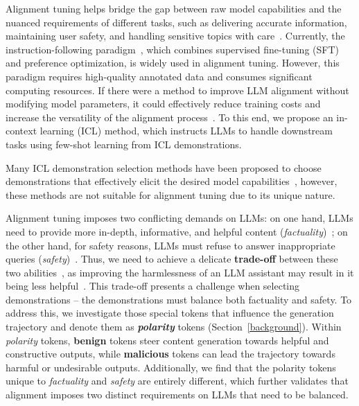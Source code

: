 %
Alignment tuning helps bridge the gap between raw model capabilities and the nuanced requirements of different tasks, such as delivering accurate information, maintaining user safety, and handling sensitive topics with care~\citep{shneiderman2020bridging,shen2023large,wang2023aligning,DBLP:conf/iclr/Qi0XC0M024}. 
%
Currently, the instruction-following paradigm~\citep{ouyang2022training,sun2023aligning,DBLP:conf/iclr/DaiPSJXL0024,rafailov2024direct,zhou2024lima,wu2024self}, which combines supervised fine-tuning (SFT) and preference optimization, is widely used in alignment tuning. 
However, this paradigm requires high-quality annotated data and consumes significant computing resources. 
If there were a method to improve LLM alignment without modifying model parameters, it could effectively reduce training costs and increase the versatility of the alignment process~\citep{brown2020language}. 
To this end, we propose an in-context learning (ICL) method, which instructs LLMs to handle downstream tasks using few-shot learning from ICL demonstrations.

Many ICL demonstration selection methods have been proposed to choose demonstrations that effectively elicit the desired model capabilities~\citep{liu2022makes,min2022rethinking,DBLP:conf/icml/Ye0F0K23,DBLP:journals/corr/abs-2305-14128,peng2024revisiting,DBLP:conf/icml/ChoiL24,DBLP:conf/eacl/WangYW24}, however, these methods are not suitable for alignment tuning due to its unique nature. 

Alignment tuning imposes two conflicting demands on LLMs: on one hand, LLMs need to provide more in-depth, informative, and helpful content (\emph{factuality})~\citep{shen2023large}; on the other hand, for safety reasons, LLMs must refuse to answer inappropriate queries (\emph{safety})~\citep{ji2024beavertails}. 
Thus, we need to achieve a delicate \textbf{trade-off} between these two abilities~\citep{DBLP:journals/corr/abs-2404-09932}, as improving the harmlessness of an LLM assistant may result in it being less helpful~\citep{DBLP:journals/corr/abs-2204-05862}.
This trade-off presents a challenge when selecting demonstrations -- the demonstrations must balance both factuality and safety. 
To address this, we investigate those special tokens that influence the generation trajectory and denote them as \emph{\textbf{polarity}} tokens (Section~\ref{background}). 
Within \emph{polarity} tokens, \textbf{\color{myblue} benign} tokens steer content generation towards helpful and constructive outputs, while \textbf{\color{myred} malicious} tokens can lead the trajectory towards harmful or undesirable outputs. Additionally, we find that the polarity tokens unique to \emph{factuality} and \emph{safety} are entirely different, which further validates that alignment imposes two distinct requirements on LLMs that need to be balanced.

